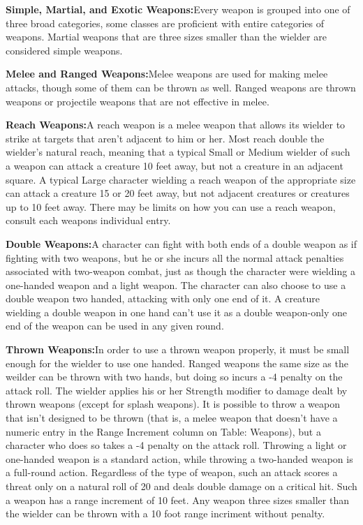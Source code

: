 \noindent\textbf{Simple, Martial, and Exotic Weapons:}{Every weapon is grouped into one of three broad categories, some classes are proficient with entire categories of weapons. Martial weapons that are three sizes smaller than the wielder are considered simple weapons.}

\noindent\textbf{Melee and Ranged Weapons:}{Melee weapons are used for making melee attacks, though some of them can be thrown as well. Ranged weapons are thrown weapons or projectile weapons that are not effective in melee.}

\noindent\textbf{Reach Weapons:}{A reach weapon is a melee weapon that allows its wielder to strike at targets that aren’t adjacent to him or her. Most reach double the wielder’s natural reach, meaning that a typical Small or Medium wielder of such a weapon can attack a creature 10 feet away, but not a creature in an adjacent square. A typical Large character wielding a reach weapon of the appropriate size can attack a creature 15 or 20 feet away, but not adjacent creatures or creatures up to 10 feet away. There may be limits on how you can use a reach weapon, consult each weapons individual entry.}

\noindent\textbf{Double Weapons:}{A character can fight with both ends of a double weapon as if fighting with two weapons, but he or she incurs all the normal attack penalties associated with two-weapon combat, just as though the character were wielding a one-handed weapon and a light weapon. The character can also choose to use a double weapon two handed, attacking with only one end of it. A creature wielding a double weapon in one hand can’t use it as a double weapon-only one end of the weapon can be used in any given round.}

\noindent\textbf{Thrown Weapons:}{In order to use a thrown weapon properly, it must be small enough for the wielder to use one handed. Ranged weapons the same size as the weilder can be thrown with two hands, but doing so incurs a -4 penalty on the attack roll. The wielder applies his or her Strength modifier to damage dealt by thrown weapons (except for splash weapons). It is possible to throw a weapon that isn’t designed to be thrown (that is, a melee weapon that doesn’t have a numeric entry in the Range Increment column on Table: Weapons), but a character who does so takes a -4 penalty on the attack roll. Throwing a light or one-handed weapon is a standard action, while throwing a two-handed weapon is a full-round action. Regardless of the type of weapon, such an attack scores a threat only on a natural roll of 20 and deals double damage on a critical hit. Such a weapon has a range increment of 10 feet. Any weapon three sizes smaller than the wielder can be thrown with a 10 foot range incriment without penalty.}

